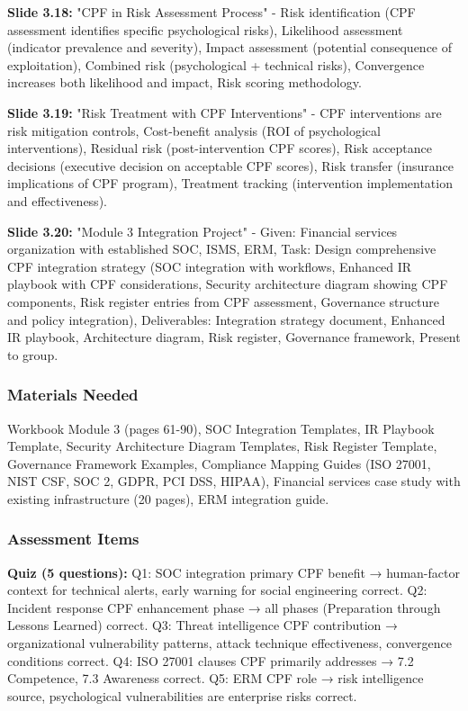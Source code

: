 \documentclass[11pt,a4paper]{article}
\begin{document}
\textbf{Slide 3.18:} "CPF in Risk Assessment Process" - Risk identification (CPF assessment identifies specific psychological risks), Likelihood assessment (indicator prevalence and severity), Impact assessment (potential consequence of exploitation), Combined risk (psychological + technical risks), Convergence increases both likelihood and impact, Risk scoring methodology.

\textbf{Slide 3.19:} "Risk Treatment with CPF Interventions" - CPF interventions are risk mitigation controls, Cost-benefit analysis (ROI of psychological interventions), Residual risk (post-intervention CPF scores), Risk acceptance decisions (executive decision on acceptable CPF scores), Risk transfer (insurance implications of CPF program), Treatment tracking (intervention implementation and effectiveness).

\textbf{Slide 3.20:} "Module 3 Integration Project" - Given: Financial services organization with established SOC, ISMS, ERM, Task: Design comprehensive CPF integration strategy (SOC integration with workflows, Enhanced IR playbook with CPF considerations, Security architecture diagram showing CPF components, Risk register entries from CPF assessment, Governance structure and policy integration), Deliverables: Integration strategy document, Enhanced IR playbook, Architecture diagram, Risk register, Governance framework, Present to group.

\subsubsection{Materials Needed}

Workbook Module 3 (pages 61-90), SOC Integration Templates, IR Playbook Template, Security Architecture Diagram Templates, Risk Register Template, Governance Framework Examples, Compliance Mapping Guides (ISO 27001, NIST CSF, SOC 2, GDPR, PCI DSS, HIPAA), Financial services case study with existing infrastructure (20 pages), ERM integration guide.

\subsubsection{Assessment Items}

\textbf{Quiz (5 questions):} Q1: SOC integration primary CPF benefit → human-factor context for technical alerts, early warning for social engineering correct. Q2: Incident response CPF enhancement phase → all phases (Preparation through Lessons Learned) correct. Q3: Threat intelligence CPF contribution → organizational vulnerability patterns, attack technique effectiveness, convergence conditions correct. Q4: ISO 27001 clauses CPF primarily addresses → 7.2 Competence, 7.3 Awareness correct. Q5: ERM CPF role → risk intelligence source, psychological vulnerabilities are enterprise risks correct.
\end{document}
